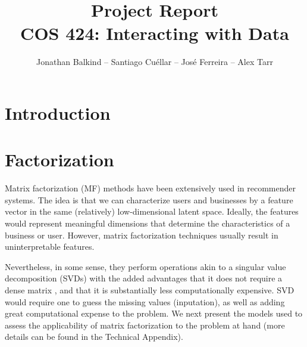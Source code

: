 \documentclass[12pt]{article}
\begin{document}
\title{Project Report \\ \vspace{5mm} \large{COS 424: Interacting with Data}}
\author{Jonathan Balkind -- Santiago Cu\'ellar -- Jos\'e Ferreira -- Alex Tarr} 
\maketitle

\begin{multicols}{2}

\section{Introduction} 


\section{Factorization}

Matrix factorization (MF) methods have been extensively used in recommender systems. The idea is that we can characterize users and businesses by a feature vector in the same (relatively) low-dimensional latent space. Ideally, the features would represent meaningful dimensions that determine the characteristics of a business or user. However, matrix factorization techniques usually result in uninterpretable features. 

Nevertheless, in some sense, they perform operations akin to a singular value decomposition (SVDs) with the added advantages that it does not require a dense matrix , and that it is substantially less computationally expensive. SVD would require one to guess the missing values (inputation), as well as adding great computational expense to the problem. We next present the models used to assess the applicability of matrix factorization to the problem at hand (more details can be found in the Technical Appendix).


\end{multicols}
\end{document}
